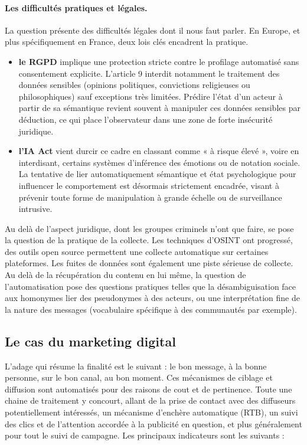 \documentclass[11pt]{article}
\begin{document}
			\paragraph{Les difficultés pratiques et légales. } La question présente des difficultés légales dont il nous faut parler. En Europe, et plus spécifiquement en France, deux lois clés encadrent la pratique. 
			\begin{itemize}
				\item \textbf{le RGPD} implique une protection stricte contre le profilage automatisé sans consentement explicite. L'article 9 interdit notamment le traitement des données sensibles (opinions politiques, convictions religieuses ou philosophiques) sauf exceptions très limitées. Prédire l'état d'un acteur à partir de sa sémantique revient souvent à manipuler ces données sensibles par déduction, ce qui place l'observateur dans une zone de forte insécurité juridique.
				\item \textbf{l'IA Act} vient durcir ce cadre en classant comme « à risque élevé », voire en interdisant, certains systèmes d'inférence des émotions ou de notation sociale. La tentative de lier automatiquement sémantique et état psychologique pour influencer le comportement est désormais strictement encadrée, visant à prévenir toute forme de manipulation à grande échelle ou de surveillance intrusive.
			\end{itemize}
			Au delà de l'aspect juridique, dont les groupes criminels n'ont que faire, se pose la question de la pratique de la collecte. Les techniques d'OSINT ont progressé, des outils open source permettent une collecte automatique sur certaines plateformes. Les fuites de données sont également une piste sérieuse de collecte. Au delà de la récupération du contenu en lui même, la question de l'automatisation pose des questions pratiques telles que la désambiguisation face aux homonymes lier des pseudonymes à des acteurs, ou une interprétation fine de la nature des messages (vocabulaire spécifique à des communautés par exemple). 

	

		\subsection{Le cas du marketing digital}
			
			L'adage qui résume la finalité est le suivant : \og{}le bon message, à la bonne personne, sur le bon canal, au bon moment\fg{}. Ces mécanismes de ciblage et diffusion sont automatisés pour des raisons de cout et de pertinence. Toute une chaine de traitement y concourt, allant de la prise de contact avec des diffuseurs potentiellement intéressés, un mécanisme d'enchère automatique (RTB), un suivi des clics et de l'attention accordée à la publicité en question, et plus généralement pour tout le suivi de campagne. Les principaux indicateurs sont les suivants : 
			
\end{document}
